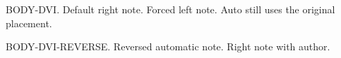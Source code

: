 \documentclass{article}
\begin{document}
BODY-DVI. Default right note.
Forced left note.
Auto still uses the original placement.
\par\vspace{6cm}
\reversemarginpar
BODY-DVI-REVERSE. Reversed automatic note.
Right note with author.
\end{document}
